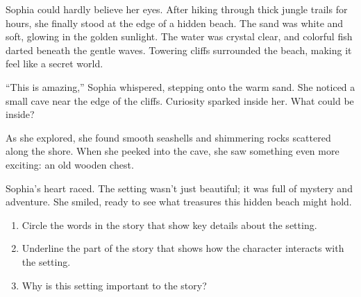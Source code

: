 \documentclass[12pt]{article}
\begin{document}
\begin{tcolorbox}[colframe=black!60, colback=white, 
coltitle=black, colbacktitle=black!15, fonttitle=\bfseries\Large, 
title=Text: The Hidden Beach, halign title=center, left=10pt, right=10pt, top=10pt, bottom=15pt]


Sophia could hardly believe her eyes. After hiking through thick jungle trails for hours, she finally stood at the edge of a hidden beach. The sand was white and soft, glowing in the golden sunlight. The water was crystal clear, and colorful fish darted beneath the gentle waves. Towering cliffs surrounded the beach, making it feel like a secret world.

“This is amazing,” Sophia whispered, stepping onto the warm sand. She noticed a small cave near the edge of the cliffs. Curiosity sparked inside her. What could be inside?

As she explored, she found smooth seashells and shimmering rocks scattered along the shore. When she peeked into the cave, she saw something even more exciting: an old wooden chest.

Sophia’s heart raced. The setting wasn’t just beautiful; it was full of mystery and adventure. She smiled, ready to see what treasures this hidden beach might hold.

 

 

\end{tcolorbox}

\vspace{1em}


\begin{tcolorbox}[colframe=black!60, colback=white, 
coltitle=black, colbacktitle=black!15, fonttitle=\bfseries\Large, 
title=Guided Practice, halign title=center, left=10pt, right=10pt, top=10pt, bottom=15pt]

\begin{enumerate}[itemsep=1em]
    \item Circle the words in the story that show key details about the setting.
    \item Underline the part of the story that shows how the character interacts with the setting.
    \item Why is this setting important to the story?
    \\[0.8cm] \underline{\hspace{14cm}}  
    \\[0.8cm] \underline{\hspace{14cm}}  
    \\[0.8cm] \underline{\hspace{14cm}} 
\end{enumerate}
\end{tcolorbox}
\vspace{1em}
\end{document}
